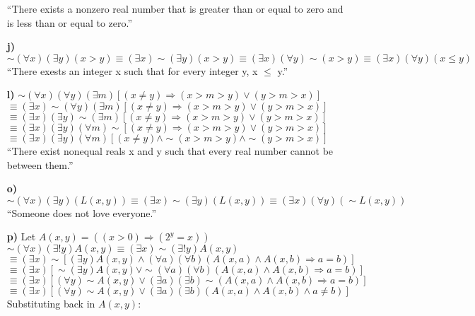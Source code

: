 \documentclass[12pt,letterpaper]{article}
\begin{document}
\begin{enumerate}[label= \textbf{\alph*)}]
						``There exists a nonzero real number that is greater than or equal to zero and is less than or equal to zero.''
	\item[\textbf{j)}] $\sim (\forall x)(\exists y)(x > y) \equiv (\exists x) \sim (\exists y)(x > y) \equiv (\exists x)(\forall y)\sim (x > y) \equiv (\exists x)(\forall y) (x \leq y)$\\
						``There exests an integer x such that for every integer y, x $\leq$ y.'' 
	\newpage
	\item[\textbf{l)}]  $\sim (\forall x)(\forall y)(\exists m)[(x \neq y) \Rightarrow (x > m > y) \lor (y > m > x)]$\\
						$\equiv (\exists x)\sim (\forall y)(\exists m)[(x \neq y) \Rightarrow (x > m > y) \lor (y > m > x)]$\\
						$\equiv (\exists x)(\exists y)\sim(\exists m)[(x \neq y) \Rightarrow (x > m > y) \lor (y > m > x)]$\\
						$\equiv (\exists x)(\exists y)(\forall m) \sim [(x \neq y) \Rightarrow (x > m > y) \lor (y > m > x)]$\\
						$\equiv (\exists x)(\exists y)(\forall m) [(x \neq y) \land \sim(x > m > y) \land \sim (y > m > x)]$\\
						``There exist nonequal reals x and y such that every real number cannot be between them.''
	\item[\textbf{o)}] $\sim (\forall x)(\exists y) (L(x,y)) \equiv (\exists x) \sim (\exists y) (L(x,y)) \equiv (\exists x)(\forall y) (\sim L(x,y))$\\
						``Someone does not love everyone.'' 
	\item[\textbf{p)}] Let $A(x,y) = ((x > 0) \Rightarrow (2^y=x))$\\
						$\sim (\forall x)(\exists! y)A(x,y) \equiv (\exists x)\sim (\exists! y)A(x,y)$\\
						$\equiv (\exists x) \sim [(\exists y) A(x,y) \land (\forall a)(\forall b)(A(x,a) \land A(x,b) \Rightarrow a = b)]$\\
						$\equiv (\exists x) [\sim(\exists y)A(x,y) \lor \sim (\forall a)(\forall b)(A(x,a)\land A(x,b) \Rightarrow a = b)]$\\
						$\equiv (\exists x) [(\forall y)\sim A(x,y) \lor (\exists a)(\exists b)\sim (A(x,a) \land A(x,b) \Rightarrow a=b)]$\\
						$\equiv (\exists x) [(\forall y)\sim A(x,y) \lor (\exists a)(\exists b)(A(x,a) \land A(x,b) \land a \neq b)]$\\
						Substituting back in $A(x,y)$:\\

\end{enumerate}
\end{document}

